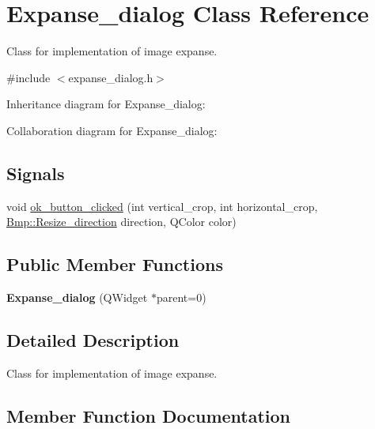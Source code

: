 \hypertarget{classExpanse__dialog}{}\section{Expanse\+\_\+dialog Class Reference}
\label{classExpanse__dialog}


Class for implementation of image expanse.  




{\ttfamily \#include $<$expanse\+\_\+dialog.\+h$>$}



Inheritance diagram for Expanse\+\_\+dialog\+:


Collaboration diagram for Expanse\+\_\+dialog\+:
\subsection*{Signals}
\begin{DoxyCompactItemize}
\item 
void \hyperlink{classExpanse__dialog_ae875af004a8f297424754da6f16f215a}{ok\+\_\+button\+\_\+clicked} (int vertical\+\_\+crop, int horizontal\+\_\+crop, \hyperlink{namespaceBmp_a17aedbe2a7f4fccdb8542a417187eea7}{Bmp\+::\+Resize\+\_\+direction} direction, Q\+Color color)
\end{DoxyCompactItemize}
\subsection*{Public Member Functions}
\begin{DoxyCompactItemize}
\item 
{\bfseries Expanse\+\_\+dialog} (Q\+Widget $\ast$parent=0)\hypertarget{classExpanse__dialog_a10b7860ad73d1d2c0ba3ef80d27524a1}{}\label{classExpanse__dialog_a10b7860ad73d1d2c0ba3ef80d27524a1}

\end{DoxyCompactItemize}


\subsection{Detailed Description}
Class for implementation of image expanse. 

\subsection{Member Function Documentation}
